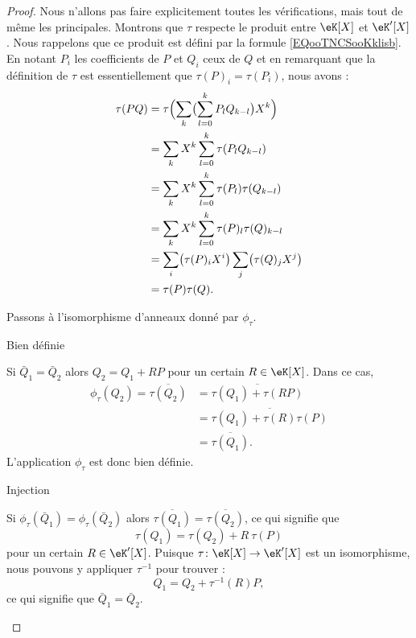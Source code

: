 \begin{proof}
	Nous n'allons pas faire explicitement toutes les vérifications, mais tout de même les principales. Montrons que \( \tau\) respecte le produit entre \( \eK[X]\) et \( \eK'[X]\). Nous rappelons que ce produit est défini par la formule \eqref{EQooTNCSooKklisb}. En notant \( P_i\) les coefficients de \( P\) et \( Q_i\) ceux de \( Q\) et en remarquant que la définition de \( \tau\) est essentiellement que \( \tau(P)_i=\tau(P_i)\), nous avons :
	\begin{subequations}
		\begin{align}
			\tau(PQ) & =\tau\Bigl( \sum_k\bigl(\sum_{l=0}^kP_lQ_{k-l}\bigr)X^k \Bigr)    \\
			         & =\sum_k X^k \sum_{l=0}^k\tau(P_lQ_{k-l})                          \\
			         & =\sum_k X^k \sum_{l=0}^k\tau(P_l)\tau(Q_{k-l})                    \\
			         & =\sum_k X^k \sum_{l=0}^k\tau(P)_l\tau(Q)_{k-l}                    \\
			         & =\sum_{i} \bigl(\tau(P)_iX^i\bigr)\sum_j\bigl(\tau(Q)_j X^j\bigr) \\
			         & =\tau(P)\tau(Q).
		\end{align}
	\end{subequations}

	Passons à l'isomorphisme d'anneaux donné par \( \phi_{\tau}\).
	\begin{subproof}
		\item[Bien définie]

		Si \( \bar Q_1=\bar Q_2\) alors \( Q_2=Q_1+RP\) pour un certain \( R\in \eK[X]\). Dans ce cas,
		\begin{subequations}
			\begin{align}
				\phi_{\tau}(Q_2)=\overline{ \tau(Q_2) } & =\overline{ \tau(Q_1)+\tau(RP) }       \\
				                                        & =\overline{ \tau(Q_1)+\tau(R)\tau(P) } \\
				                                        & =\overline{ \tau(Q_1) }.
			\end{align}
		\end{subequations}
		L'application \( \phi_{\tau}\) est donc bien définie.

		\item[Injection]

		Si \( \phi_{\tau}(\bar Q_1)=\phi_{\tau}(\bar Q_2)\) alors \( \overline{ \tau(Q_1) }=\overline{ \tau(Q_2) }\), ce qui signifie que
		\begin{equation}
			\tau(Q_1)=\tau(Q_2)+R\ \tau(P)
		\end{equation}
		pour un certain \( R\in \eK'[X]\). Puisque \( \tau\colon \eK[X]\to \eK'[X]\) est un isomorphisme, nous pouvons y appliquer \( \tau^{-1}\) pour trouver :
		\begin{equation}
			Q_1=Q_2+\tau^{-1}(R)P,
		\end{equation}
		ce qui signifie que \( \bar Q_1=\bar Q_2\).


\end{subproof}
\end{proof}
